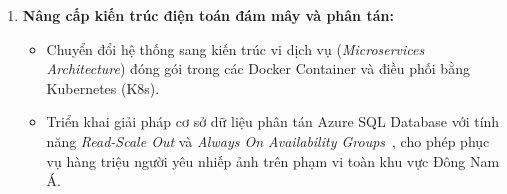 \begin{enumerate}[leftmargin=2em]
    \item \textbf{Nâng cấp kiến trúc điện toán đám mây và phân tán:}
    \begin{itemize}
        \item Chuyển đổi hệ thống sang kiến trúc vi dịch vụ (\textit{Microservices Architecture}) đóng gói trong các Docker Container và điều phối bằng Kubernetes (K8s).
        \item Triển khai giải pháp cơ sở dữ liệu phân tán Azure SQL Database với tính năng \textit{Read-Scale Out} và \textit{Always On Availability Groups}~\cite{liu2023microservices}, cho phép phục vụ hàng triệu người yêu nhiếp ảnh trên phạm vi toàn khu vực Đông Nam Á.
    \end{itemize}
\end{enumerate}
